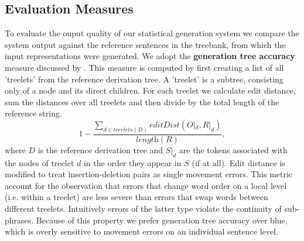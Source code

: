 \subsection{Evaluation Measures}
\label{ssec:eval-measures}
To evaluate the ouput quality of our statistical generation system we compare the system output against the reference sentences in the treebank, from which the input representations were generated. We adopt the {\bf generation tree accuracy} measure discussed by \cite{bangalorerambowwhittaker2001}.
This measure is computed by first creating a list of all 'treelets' from the reference derivation tree. A 'treelet' is a subtree, consisting only of a node and its direct children. For each treelet we calculate edit distance, sum the distances over all treelets and then divide by the total length of the reference string.
$$1 - \frac{\sum\limits_{d \in treelets(D)} editDist(O|_d, R|_d)}{\textit{length}(R)},$$
where $D$ is the reference derivation tree and $S|_d$ are the tokens associated with the nodes of treelet $d$ in the order they appear in $S$ (if at all). 
Edit distance is modified to treat insertion-deletion pairs as single movement errors. 
This metric account for the observation that errors that change word order on a local level (i.e. within a treelet) are less severe than errors that swap words between different treelets. Intuitively errors of the latter type violate the continuity of sub-phrases. Because of this property we prefer generation tree accuracy over {\sc blue}, which is overly sensitive to movement errors on an individual sentence level.



